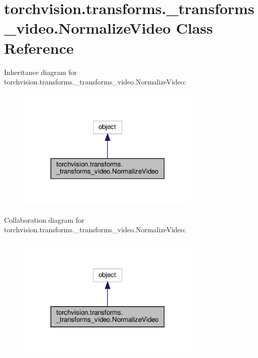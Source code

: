 \hypertarget{classtorchvision_1_1transforms_1_1__transforms__video_1_1NormalizeVideo}{}\section{torchvision.\+transforms.\+\_\+transforms\+\_\+video.\+Normalize\+Video Class Reference}
\label{classtorchvision_1_1transforms_1_1__transforms__video_1_1NormalizeVideo}


Inheritance diagram for torchvision.\+transforms.\+\_\+transforms\+\_\+video.\+Normalize\+Video\+:
\nopagebreak
\begin{figure}[H]
\begin{center}
\leavevmode
\includegraphics[width=249pt]{classtorchvision_1_1transforms_1_1__transforms__video_1_1NormalizeVideo__inherit__graph}
\end{center}
\end{figure}


Collaboration diagram for torchvision.\+transforms.\+\_\+transforms\+\_\+video.\+Normalize\+Video\+:
\nopagebreak
\begin{figure}[H]
\begin{center}
\leavevmode
\includegraphics[width=249pt]{classtorchvision_1_1transforms_1_1__transforms__video_1_1NormalizeVideo__coll__graph}
\end{center}
\end{figure}
